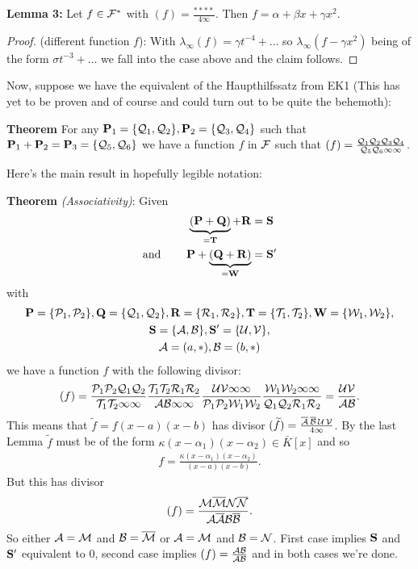 \documentclass[english,11pt,a4paper]{article}
\begin{document}
\textbf{Lemma 3:} Let $f \in \F^*$ with $(f)=\frac{****}{4\infty}$. Then $f = \alpha + \beta x + \gamma x^2$.

\begin{proof}
	(different function $f$): With $\lambda_\infty(f) = \gamma t^{-4}+\dots$ so $\lambda_\infty(f-\gamma x^2)$ being of the form $\sigma t^{-3}+\dots$ we fall into the case above and the claim follows.
\end{proof}
\vspace{-8mm}
\fline

Now, suppose we have the equivalent of the Haupthilfssatz from EK1 (This has yet to be proven and of course and could turn out to be quite the behemoth):

\textbf{Theorem} For any $\P_1=\{\q_1,\q_2\}, \P_2= \{\q_3,\q_4\}$ such that $\P_1 + \P_2 = \P_3 = \{\q_5,\q_6\}$ we have a function $f$ in $\F$ such that $(f) = \frac{\q_1 \q_2 \q_3 \q_4}{\q_5 \q_6 \infty \infty}$.

Here's the main result in hopefully legible notation:

\textbf{Theorem} \textit{(Associativity)}: Given
\begin{align*}
	\underbrace{(\P + \Q)}_{= \T} + \R &= \S
	\\
	\text{and\hspace{8mm}}\P + \underbrace{(\Q + \R)}_{=\W} &= \S'
\end{align*}
with
\begin{gather*}
  \P=\{\p_1,\p_2\}, 
  \Q=\{\q_1,\q_2\}, 
  \R=\{\r_1,\r_2\}, 
  \T=\{\t_1,\t_2\}, 
  \W=\{\w_1,\w_2\},
  \\
  \S = \{\a, \b \}, 
  \S' = \{\u, \v \},
  \\
  \a = (a,*), \b = (b,*)
\end{gather*}
we have a function $f$ with the following divisor:
\begin{align*}
  (f)=\frac{\p_1 \p_2 \q_1 \q_2}{\t_1 \t_2 \infty \infty}\frac{\t_1 \t_2 \r_1 \r_2}{\a \b \infty \infty}\frac{\u \v \infty \infty}{\p_1 \p_2 \w_1 \w_2}\frac{\w_1 \w_2 \infty \infty}{\q_1 \q_2 \r_1 \r_2} =\frac{\u \v}{\a \b}.
\end{align*}
This means that $\tilde f = f(x-a)(x-b)$ has divisor $(\tilde f) = \frac{\bar \a\hspace{.5mm}\bar \b\hspace{.5mm} \u\hspace{.5mm} \v}{4 \infty}$. By the last Lemma $\tilde f$ must be of the form $\kappa(x-\alpha_1)(x-\alpha_2)\in \bar K [x]$ and so
\begin{align*}
	f=\frac{\kappa(x-\alpha_1)(x-\alpha_2)}{(x-a)(x-b)}.
\end{align*}
But this has divisor
\begin{align*}
	(f) = \frac{\m \bar \m \n \bar \n}{\a \bar \a \b \bar \b}.
\end{align*}
So either $\a = \m$ and $\b = \bar \m$ or $\a = \m$ and $\b = \n$. First case implies $\S$ and $\S'$ equivalent to 0, second case implies $(f)=\frac{\a \b}{\a \b}$ and in both cases we're done.
\end{document}
